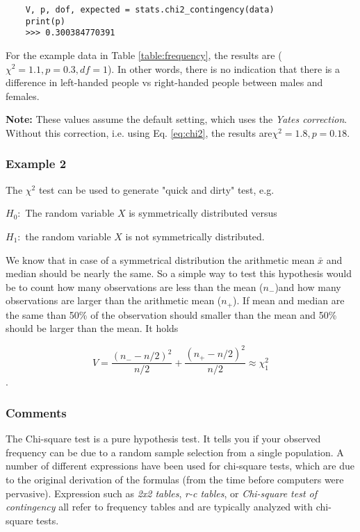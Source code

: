 \begin{lstlisting}
    V, p, dof, expected = stats.chi2_contingency(data)
    print(p)
    >>> 0.300384770391
\end{lstlisting}

For the example data in Table \ref{table:frequency}, the results are ($\chi^2=1.1, p=0.3, df=1$). In other words, there is no indication that there is a difference in left-handed people vs right-handed people between males and females.

\textbf{Note:} These values assume the default setting, which uses the \emph{Yates correction}. Without this correction, i.e. using Eq. \ref{eq:chi2}, the results are$\chi^2=1.8, p=0.18$.

\subsubsection{Example 2}

The $\chi^2$ test can be used to generate "quick and dirty" test, e.g.

$H_0:$ The random variable $X$ is symmetrically distributed versus

$H_1:$ the random variable $X$ is not symmetrically distributed.

We know that in case of a symmetrical distribution the arithmetic mean $\bar{x}$ and median should be nearly the same. So a simple way to test this hypothesis would be to count how many observations  are less than the mean ($n_-$)and how many observations are larger than the arithmetic mean ($n_+$). If mean and median are the same than 50\% of the observation should smaller than the mean and 50\% should be larger than the mean. It holds

\begin{equation}
  V = \frac{(n_- - n/2)^2}{n/2} + \frac{(n_+ - n/2)^2}{n/2} \approx \chi^2_1
\end{equation}.


\subsubsection{Comments}
The Chi-square test is a pure hypothesis test. It tells you if your observed frequency can be due to a random sample selection from a single population. A number of different expressions have been used for chi-square tests, which are due to the original derivation of the formulas (from the time before computers were pervasive). Expression such as \emph{2x2 tables}, \emph{r-c tables}, or \emph{Chi-square test of contingency} all refer to frequency tables and are typically analyzed with chi-square tests.


